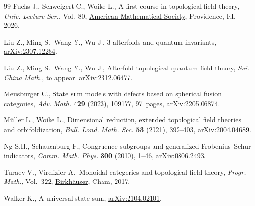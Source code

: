 \documentclass[pdftex]{sigma}
\numberwithin{equation}{section}
\theoremstyle{definition}
\begin{document}
\begin{thebibliography}{99}
Fuchs J., Schweigert C., Woike L., A first course in topological field theory,
 \textit{Univ. Lecture Ser.}, Vol.~80,
 \href{https://doi.org/10.1090/ulect/080}{American Mathematical Society},
 Providence, RI, 2026.

Liu Z., Ming S., Wang Y., Wu J., 3-alterfolds and quantum invariants,
 \href{http://arxiv.org/abs/2307.12284}{arXiv:2307.12284}.

Liu Z., Ming S., Wang Y., Wu J., Alterfold topological quantum field theory,
 \textit{Sci. China Math.}, {t}o appear,
 \href{http://arxiv.org/abs/2312.06477}{arXiv:2312.06477}.

Meusburger C., State sum models with defects based on spherical fusion
 categories, \href{https://doi.org/10.1016/j.aim.2023.109177}{\textit{Adv.
 Math.}} \textbf{429} (2023), 109177, 97~pages,
 \href{http://arxiv.org/abs/2205.06874}{arXiv:2205.06874}.

M\"uller L., Woike L., Dimensional reduction, extended topological field
 theories and orbifoldization,
 \href{https://doi.org/10.1112/blms.12427}{\textit{Bull. Lond. Math. Soc.}}
 \textbf{53} (2021), 392--403,
 \href{http://arxiv.org/abs/2004.04689}{arXiv:2004.04689}.

Ng S.H., Schauenburg P., Congruence subgroups and generalized
 {F}robenius--{S}chur indicators,
 \href{https://doi.org/10.1007/s00220-010-1096-6}{\textit{Comm. Math. Phys.}}
 \textbf{300} (2010), 1--46,
 \href{http://arxiv.org/abs/0806.2493}{arXiv:0806.2493}.

Turaev V., Virelizier A., Monoidal categories and topological field theory,
 \textit{Progr. Math.}, Vol.~322,
 \href{https://doi.org/10.1007/978-3-319-49834-8}{Birkh\"auser}, Cham, 2017.

Walker K., A universal state sum,
 \href{http://arxiv.org/abs/2104.02101}{arXiv:2104.02101}.

\end{thebibliography}\LastPageEnding
\end{document}

